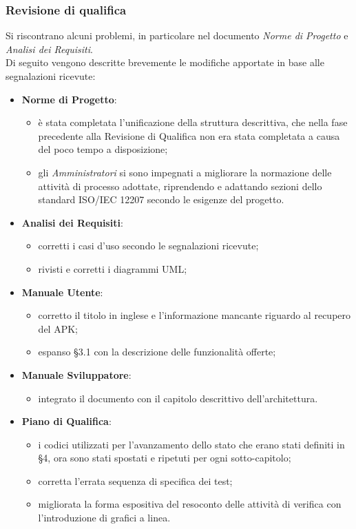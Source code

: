 	\subsubsection{Revisione di qualifica}
	Si riscontrano alcuni problemi, in particolare nel documento \textit{Norme di Progetto} e \textit{Analisi dei Requisiti}.\\
	Di seguito vengono descritte brevemente le modifiche apportate in base alle segnalazioni ricevute:
	\begin{itemize}
		\item \textbf{Norme di Progetto}: 
			\begin{itemize}
				\item è stata completata l'unificazione della struttura descrittiva, che nella fase precedente alla Revisione di Qualifica non era stata completata a causa del poco tempo a disposizione;
				\item gli \textit{Amministratori} si sono impegnati a migliorare la normazione delle attività di processo adottate, riprendendo e adattando sezioni dello standard ISO/IEC 12207 secondo le esigenze del progetto.  
			\end{itemize}
		\item \textbf{Analisi dei Requisiti}:
			\begin{itemize}
				\item corretti i casi d'uso secondo le segnalazioni ricevute;
				\item rivisti e corretti i diagrammi UML;
			\end{itemize}
		\item \textbf{Manuale Utente}:
			\begin{itemize}
				\item corretto il titolo in inglese e l'informazione mancante riguardo al recupero del 
				APK;
				\item espanso §3.1 con la descrizione delle funzionalità offerte;
			\end{itemize}
		\item \textbf{Manuale Sviluppatore}:
			\begin{itemize}
				\item integrato il documento con il capitolo descrittivo dell'architettura.
			\end{itemize}
		\item \textbf{Piano di Qualifica}:
			\begin{itemize}
				\item i codici utilizzati per l'avanzamento dello stato che erano stati definiti in §4, ora sono stati spostati e ripetuti per ogni sotto-capitolo;
				\item corretta l'errata sequenza di specifica dei test;
				\item migliorata la forma espositiva del resoconto delle attività di verifica con l'introduzione di grafici a linea.
			\end{itemize}
	\end{itemize}
	\newpage
